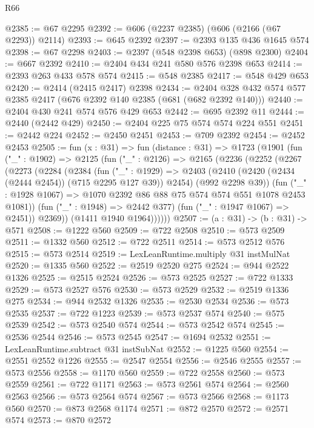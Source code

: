 \begin{lexlean}{R66}
\begin{coremodule}
@2385 := @67 @2295
@2392 := @606 (@2237 @2385) (@606 (@2166 (@67 @2293)) @2114)
@2393 := @645 @2392
@2397 := @2393 @135 @436 @1645 @574
@2398 := @67 @2298
@2403 := @2397 (@548 @2398 @653) (@898 @2300)
@2404 := @667 @2392
@2410 := @2404 @434 @241 @580 @576 @2398 @653
@2414 := @2393 @263 @433 @578 @574
@2415 := @548 @2385
@2417 := @548 @429 @653
@2420 := @2414 (@2415 @2417) @2398
@2434 := @2404 @328 @432 @574 @577 @2385 @2417 (@676 @2392 @140 @2385 (@681 (@682 @2392 @140)))
@2440 := @2404 @430 @241 @574 @576 @429 @653
@2442 := @695 @2392 @11
@2444 := @2440 (@2442 @429)
@2450 := @2404 @225 @75 @574 @574 @224 @551
@2451 := @2442 @224
@2452 := @2450 @2451
@2453 := @709 @2392
@2454 := @2452 @2453
@2505 := fun (x : @31) =>
  fun (distance : @31) =>
  @1723
    (@1901
      (fun ("_" : @1902) =>
      @2125
        (fun ("_" : @2126) =>
        @2165
          (@2236
            (@2252
              (@2267
                (@2273
                  (@2284
                    (@2384
                      (fun ("_" : @1929) =>
                      @2403
                        (@2410 (@2420 (@2434 (@2444 @2454)) (@715 @2295 @127 @39)) @2454)
                        (@992 @2298 @39))
                      (fun ("_" : @1928 @1067) =>
                      @1070 @2392 @86 @88 @75 @574 @574 @551 @1078 @2453 @1081))
                    (fun ("_" : @1948) => @2442 @377)
                    (fun ("_" : @1947 @1067) => @2451))
                  @2369))
              (@1411 @1940 @1964))))))
@2507 := (a : @31) -> (b : @31) -> @571
@2508 := @1222 @560
@2509 := @722 @2508
@2510 := @573 @2509
@2511 := @1332 @560
@2512 := @722 @2511
@2514 := @573 @2512 @576
@2515 := @573 @2514
@2519 := LexLeanRuntime.multiply @31 instMulNat
@2520 := @1335 @560
@2522 := @2519 @2520 @275
@2524 := @944 @2522 @1326
@2525 := @2515 @2524
@2526 := @573 @2525
@2527 := @722 @1333
@2529 := @573 @2527 @576
@2530 := @573 @2529
@2532 := @2519 @1336 @275
@2534 := @944 @2532 @1326
@2535 := @2530 @2534
@2536 := @573 @2535
@2537 := @722 @1223
@2539 := @573 @2537 @574
@2540 := @575 @2539
@2542 := @573 @2540 @574
@2544 := @573 @2542 @574
@2545 := @2536 @2544
@2546 := @573 @2545
@2547 := @1694 @2532
@2551 := LexLeanRuntime.subtract @31 instSubNat
@2552 := @1225 @560
@2554 := @2551 @2552 @1226
@2555 := @2547 @2554
@2556 := @2546 @2555
@2557 := @573 @2556
@2558 := @1170 @560
@2559 := @722 @2558
@2560 := @573 @2559
@2561 := @722 @1171
@2563 := @573 @2561 @574
@2564 := @2560 @2563
@2566 := @573 @2564 @574
@2567 := @573 @2566
@2568 := @1173 @560
@2570 := @873 @2568 @1174
@2571 := @872 @2570
@2572 := @2571 @574
@2573 := @870 @2572

\end{coremodule}
\end{lexlean}
